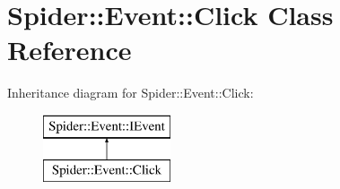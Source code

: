 \hypertarget{class_spider_1_1_event_1_1_click}{}\section{Spider\+:\+:Event\+:\+:Click Class Reference}
\label{class_spider_1_1_event_1_1_click}
Inheritance diagram for Spider\+:\+:Event\+:\+:Click\+:\begin{figure}[H]
\begin{center}
\leavevmode
\includegraphics[height=2.000000cm]{class_spider_1_1_event_1_1_click}
\end{center}
\end{figure}
